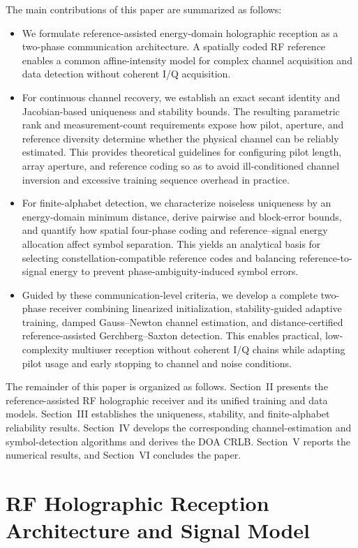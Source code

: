 \documentclass[journal]{IEEEtran}
\begin{document}
The main contributions of this paper are summarized as follows:
\begin{itemize}
\item We formulate reference-assisted energy-domain holographic reception as a
two-phase communication architecture. A spatially coded RF reference enables a
common affine-intensity model for complex channel acquisition and data
detection without coherent I/Q acquisition.
\item For continuous channel recovery, we establish an exact secant identity
and Jacobian-based uniqueness and stability bounds. The resulting parametric
rank and measurement-count requirements expose how pilot, aperture, and
reference diversity determine whether the physical channel can be reliably
estimated. This provides theoretical guidelines for configuring pilot length, array aperture, and reference coding so as to avoid ill-conditioned channel inversion and excessive training sequence overhead in practice.
\item For finite-alphabet detection, we characterize noiseless uniqueness by
an energy-domain minimum distance, derive pairwise and block-error bounds, and
quantify how spatial four-phase coding and reference--signal energy allocation
affect symbol separation. This yields an analytical basis for selecting constellation-compatible reference codes and balancing reference-to-signal energy to prevent phase-ambiguity-induced symbol errors.
\item Guided by these communication-level criteria, we develop a complete
two-phase receiver combining linearized initialization, stability-guided
adaptive training, damped Gauss--Newton channel estimation, and
distance-certified reference-assisted Gerchberg--Saxton detection. This enables practical, low-complexity multiuser reception without coherent I/Q chains while adapting pilot usage and early stopping to channel and noise conditions.
\end{itemize}

The remainder of this paper is organized as follows. Section~II presents the
reference-assisted RF holographic receiver and its unified training and data
models. Section~III establishes the uniqueness, stability, and finite-alphabet
reliability results. Section~IV develops the corresponding channel-estimation
and symbol-detection algorithms and derives the DOA CRLB. Section~V reports the
numerical results, and Section~VI concludes the paper.


\section{RF Holographic Reception Architecture and Signal Model}
\label{sec:system_model}
\end{document}
